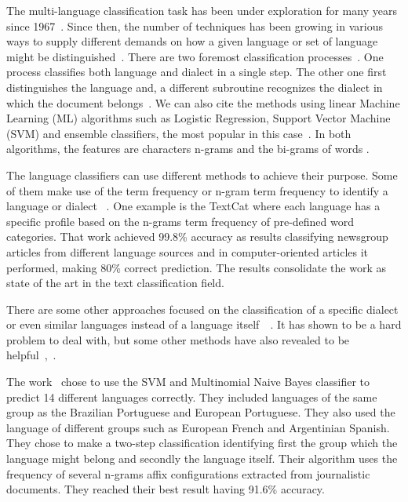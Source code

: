 \documentclass[runningheads]{llncs}
\begin{document}
    The multi-language classification task has been under exploration for many years since 1967~\cite{cabral_2015}. Since then, the number of techniques has been growing in various ways to supply different demands on how a given language or set of language might be distinguished~\cite{jauhiainen2019automatic}. There are two foremost classification processes~\cite{gomez2017discriminating}. One process classifies both language and dialect in a single step. The other one first distinguishes the language and, a different subroutine recognizes the dialect in which the document belongs~\cite{gomez2017discriminating}. We can also cite the methods using linear Machine Learning (ML) algorithms such as Logistic Regression, Support Vector Machine (SVM) and ensemble classifiers, the most popular in this case~\cite{gomez2017discriminating}. In both algorithms, the features are characters n-grams and the bi-grams of words \cite{gomez2017discriminating}.

    The language classifiers can use different methods to achieve their purpose. Some of them make use of the term frequency or n-gram term frequency to identify a language or dialect ~\cite{jauhiainen2019automatic}. One example is the TextCat \cite{cavnar1994n} where each language has a specific profile based on the n-grams term frequency of pre-defined word categories. That work achieved 99.8\%
    accuracy as results classifying newsgroup articles from different language sources and in computer-oriented articles it performed, making 80\% correct prediction. The results consolidate the work as state of the art in the text classification field.

    There are some other approaches focused on the classification of a specific dialect or even similar languages instead of a language itself~\cite{jauhiainen2019automatic}~\cite{gomez2017discriminating}. It has shown to be a hard problem to deal with, but some other methods have also revealed to be helpful~\cite{jauhiainen2019automatic},~\cite{gomez2017discriminating}.

    The work~\cite{gomez2017discriminating} chose to use the SVM and Multinomial Naive Bayes classifier to predict 14 different languages correctly. They included languages of the same group as the Brazilian Portuguese and European Portuguese. They also used the language of different groups such as European French and Argentinian Spanish. They chose to make a two-step classification identifying first the group which the language might belong and secondly the language itself. Their algorithm uses the frequency of several n-grams affix configurations extracted from journalistic documents. They reached their best result having 91.6\% accuracy.
\end{document}
